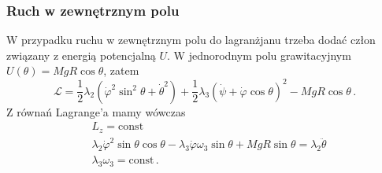 \documentclass[../main.tex]{subfiles}
\begin{document}
    \subsubsection*{Ruch w zewnętrznym polu}
    W przypadku ruchu w zewnętrznym polu do lagranżjanu trzeba dodać człon związany z energią potencjalną \(U\). W jednorodnym polu grawitacyjnym \(U(\theta)=MgR\cos\theta\), zatem
    \begin{equation*}
        \mathcal{L}=\frac{1}{2}\lambda_2(\dot{\varphi}^2\sin^2\theta+\dot{\theta}^2)+\frac{1}{2}\lambda_3(\dot\psi+\dot\varphi\cos\theta)^2-MgR\cos\theta\,.
    \end{equation*}
    Z równań Lagrange'a mamy wówczas
    \begin{equation*}
        \begin{split}
            &L_z=\text{const}\\
            &\lambda_2\dot{\varphi}^2\sin\theta\cos\theta-\lambda_3\dot{\varphi}\omega_3\sin\theta+MgR\sin\theta=\lambda_2\ddot\theta\\
            &\lambda_3\omega_3=\text{const}\,.
        \end{split}
    \end{equation*}
\end{document}
